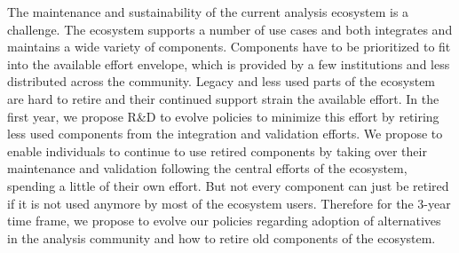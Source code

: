 \documentclass[12pt,a4paper]{article}
\begin{document}
The maintenance and sustainability of the current analysis ecosystem is a challenge. The ecosystem supports a number of use cases and both integrates and maintains a wide variety of components. Components have to be prioritized to fit into the available effort envelope, which is provided by a few institutions and less distributed across the community. Legacy and less used parts of the ecosystem are hard to retire and their continued support strain the available effort. In the first year, we propose R\&D to evolve policies to minimize this effort by retiring less used components from the integration and validation efforts. We propose to enable individuals to continue to use retired components by taking over their maintenance and validation following the central efforts of the ecosystem, spending a little of their own effort. 
But not every component can just be retired if it is not used anymore by most of the ecosystem users. Therefore for the 3-year time frame, we propose to evolve our policies regarding adoption of alternatives in the analysis community and how to retire old components of the ecosystem.
\end{document}
